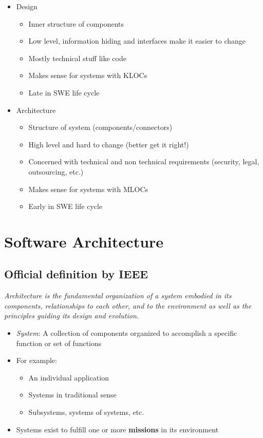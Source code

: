 \documentclass[12pt]{book}
\begin{document}
\begin{itemize}
  \item Design
  \begin{itemize}
    \item Inner structure of components
    \item Low level, information hiding and interfaces make it easier to change
    \item Mostly technical stuff like code
    \item Makes sense for systems with KLOCs
    \item Late in SWE life cycle
  \end{itemize} 

  \item Architecture
  \begin{itemize}
    \item Structure of system (components/connectors)
    \item High level and hard to change (better get it right!)
    \item Concerned with technical and non technical requirements (security, legal, outsourcing, etc.)
    \item Makes sense for systems with MLOCs
    \item Early in SWE life cycle
  \end{itemize} 
\end{itemize}

\section*{Software Architecture}
\subsection*{Official definition by IEEE}
\textit{Architecture is the fundamental organization of a system embodied in its components, relationships to each other, and to the environment as well as the principles guiding its design and evolution}.

\begin{itemize}
  \item \textit{System}: A collection of components organized to accomplish a specific function or set of functions
  \item For example:
  \begin{itemize}
    \item An individual application
    \item Systems in traditional sense
    \item Subsystems, systems of systems, etc.
  \end{itemize} 

  \item Systems exist to fulfill one or more \textbf{missions} in its environment
\end{itemize}
\end{document}
